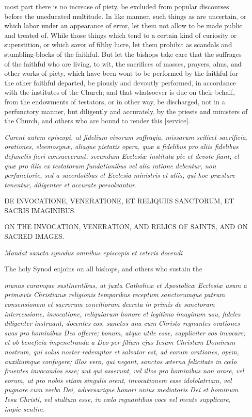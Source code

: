 most part there is no increase of piety, be excluded from popular discourses before the uneducated multitude. In like manner, such things as are uncertain, or which labor under an appearance of error, let them not allow to be made public and treated of. While those things which tend to a certain kind of curiosity or superstition, or which savor of filthy lucre, let them prohibit as scandals and stumbling-blocks of the faithful. But let the bishops take care that the suffrages of the faithful who are living, to wit, the sacrifices of masses, prayers, alms, and other works of piety, which have been wont to be performed by the faithful for the other faithful departed, be piously and devoutly performed, in accordance with the institutes of the Church; and that whatsoever is due on their behalf, from the endowments of testators, or in other way, be discharged, not in a perfunctory manner, but diligently and accurately, by the priests and ministers of the Church, and others who are bound to render this [service].

\emph{Curent autem episcopi, ut fidelium vivorum suffragia, missarum scilicet sacrificia, orationes, eleemosynæ, aliaque pietatis opera, quæ a fidelibus pro aliis fidelibus defunctis fieri consueverunt, secundum Ecclesiæ instituta pie et devote fiant; et quæ pro illis ex testatorum fundationibus vel alia ratione debentur, non perfunctorie, sed a sacerdotibus et Ecclesia ministris et aliis, qui hoc præstare tenentur, diligenter et accurate persolvantur.}

DE INVOCATIONE, VENERATIONE, ET RELIQUIIS SANCTORUM, ET SACRIS IMAGINIBUS.

ON THE INVOCATION, VENERATION, AND RELICS OF SAINTS, AND ON SACRED IMAGES.

\emph{Mandat sancta synodus omnibus episcopis et ceteris docendi }

The holy Synod enjoins on all bishops, and others who sustain the

\emph{munus curamque sustinentibus, ut juxta Catholicæ et Apostolicæ Ecclesiæ usum a primævis Christianæ religionis temporibus receptum sanctorumque patrum consensionem et sacrorum conciliorum decreta in primis de sanctorum intercessione, invocatione, reliquiarum honore et legitimo imaginum usu, fideles diligenter instruant, docentes eos, sanctos una cum Christo regnantes orationes suas pro hominibus Deo offerre; bonum, atque utile esse, suppliciter eos invocare; et ob beneficia impenetranda a Deo per filium ejus Iesum Christum Dominum nostrum, qui solus noster redemptor et salvator est, ad eorum orationes, opem, auxiliumque confugere; illos vero, qui negant, sanctos æterna felicitate in cœlo fruentes invocandos esse; aut qui asserunt, vel illos pro hominibus non orare, vel eorum, ut pro nobis etiam singulis orent, invocationem esse idololatriam, vel pugnare cum verbo Dei, adversarique honori unius mediatoris Dei et hominum Iesu Christi, vel stultum esse, in cœlo regnantibus voce vel mente supplicare, impie sentire.}

